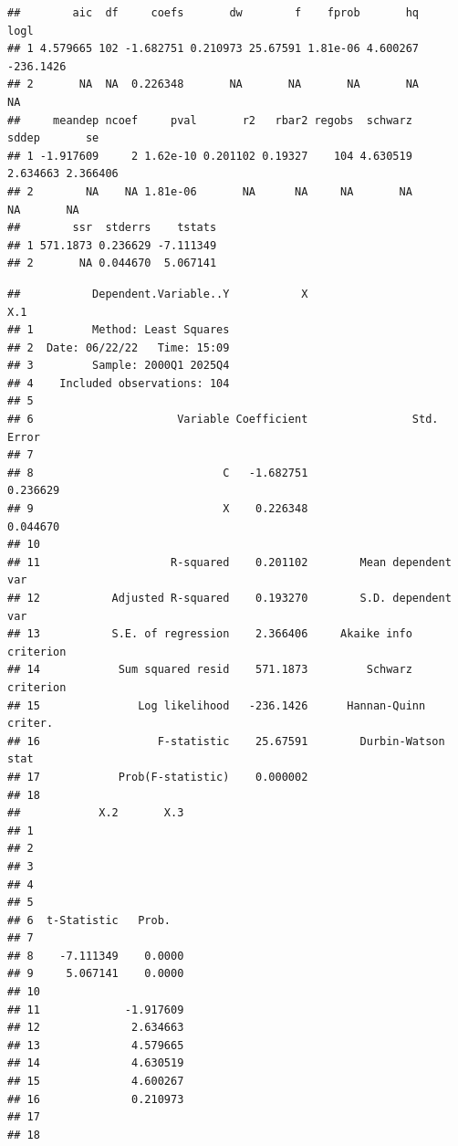 \documentclass[
]{article}
\begin{document}
\begin{verbatim}
##        aic  df     coefs       dw        f    fprob       hq      logl
## 1 4.579665 102 -1.682751 0.210973 25.67591 1.81e-06 4.600267 -236.1426
## 2       NA  NA  0.226348       NA       NA       NA       NA        NA
##     meandep ncoef     pval       r2   rbar2 regobs  schwarz    sddep       se
## 1 -1.917609     2 1.62e-10 0.201102 0.19327    104 4.630519 2.634663 2.366406
## 2        NA    NA 1.81e-06       NA      NA     NA       NA       NA       NA
##        ssr  stderrs    tstats
## 1 571.1873 0.236629 -7.111349
## 2       NA 0.044670  5.067141
\end{verbatim}

\begin{verbatim}
##           Dependent.Variable..Y           X                       X.1
## 1         Method: Least Squares                                      
## 2  Date: 06/22/22   Time: 15:09                                      
## 3         Sample: 2000Q1 2025Q4                                      
## 4    Included observations: 104                                      
## 5                                                                    
## 6                      Variable Coefficient                Std. Error
## 7                                                                    
## 8                             C   -1.682751                  0.236629
## 9                             X    0.226348                  0.044670
## 10                                                                   
## 11                    R-squared    0.201102        Mean dependent var
## 12           Adjusted R-squared    0.193270        S.D. dependent var
## 13           S.E. of regression    2.366406     Akaike info criterion
## 14            Sum squared resid    571.1873         Schwarz criterion
## 15               Log likelihood   -236.1426      Hannan-Quinn criter.
## 16                  F-statistic    25.67591        Durbin-Watson stat
## 17            Prob(F-statistic)    0.000002                          
## 18                                                                   
##            X.2       X.3
## 1                       
## 2                       
## 3                       
## 4                       
## 5                       
## 6  t-Statistic   Prob.  
## 7                       
## 8    -7.111349    0.0000
## 9     5.067141    0.0000
## 10                      
## 11             -1.917609
## 12              2.634663
## 13              4.579665
## 14              4.630519
## 15              4.600267
## 16              0.210973
## 17                      
## 18
\end{verbatim}
\end{document}
